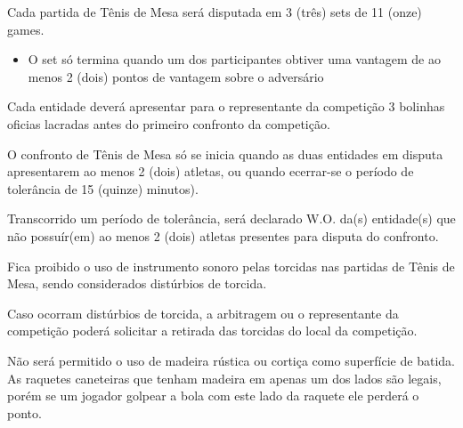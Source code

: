 \noindent
Cada partida de Tênis de Mesa será disputada em 3 (três) sets de 11 (onze) games.
\begin{itemize}[noitemsep]
	\item O set só termina quando um dos participantes obtiver uma vantagem de ao menos 2 (dois) pontos de vantagem sobre o adversário
\end{itemize}

\begin{article}
	Cada entidade deverá apresentar para o representante da competição 3 bolinhas oficias lacradas antes do primeiro confronto da competição.
\end{article}

\begin{article}
	O confronto de Tênis de Mesa só se inicia quando as duas entidades em disputa apresentarem ao menos 2 (dois) atletas, ou quando ecerrar-se o período de tolerância de 15 (quinze) minutos).

	\begin{xparagraph}
		Transcorrido um período de tolerância, será declarado W.O. da(s) entidade(s) que não possuír(em) ao menos 2 (dois) atletas presentes para disputa do confronto.
	\end{xparagraph}
\end{article}

\begin{article}
	Fica proibido o uso de instrumento sonoro pelas torcidas nas partidas de Tênis de Mesa, sendo considerados distúrbios de torcida.

	\begin{xparagraph}
		Caso ocorram distúrbios de torcida, a arbitragem ou o representante da competição poderá solicitar a retirada das torcidas do local da competição.
	\end{xparagraph}
\end{article}

\begin{article}
	Não será permitido o uso de madeira rústica ou cortiça como superfície de batida. As raquetes caneteiras que tenham madeira em apenas um dos lados são legais, porém se um jogador golpear a bola com este lado da raquete ele perderá o ponto.
\end{article}
